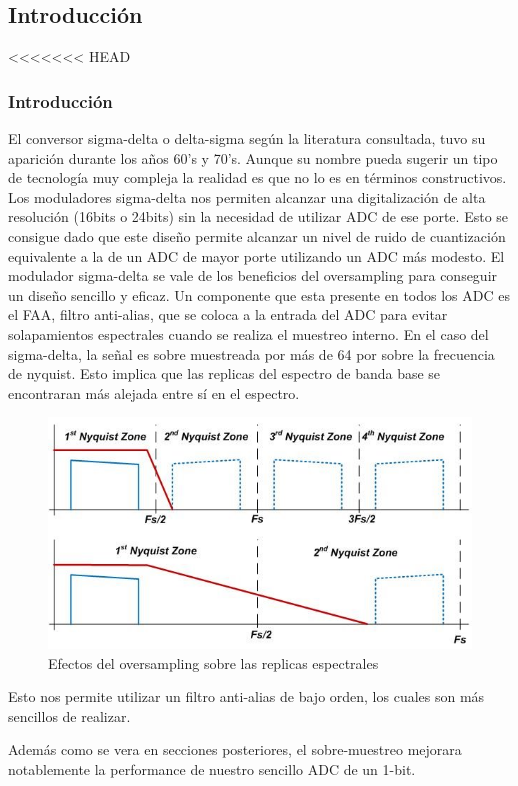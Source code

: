 
\subsection{Introducción}


<<<<<<< HEAD
\subsubsection{Introducción}
El conversor sigma-delta o delta-sigma según la literatura consultada, tuvo su aparición durante los años 60's y 70's. Aunque su nombre pueda sugerir un tipo de tecnología muy compleja la realidad es que no lo es en términos constructivos. Los moduladores sigma-delta nos permiten alcanzar una digitalización de alta resolución (16bits o 24bits) sin la necesidad de utilizar ADC de ese porte. Esto se consigue dado que este diseño permite alcanzar un nivel de ruido de cuantización equivalente a la de un ADC de mayor porte utilizando un ADC más modesto.
El modulador sigma-delta se vale de los beneficios del oversampling para conseguir un diseño sencillo y eficaz.
Un componente que esta presente en todos los ADC es el FAA, filtro anti-alias, que se coloca a la entrada del ADC para evitar solapamientos espectrales cuando se realiza el muestreo interno. En el caso del sigma-delta,  la señal es sobre muestreada por más de 64 por sobre la frecuencia de nyquist. Esto implica que las replicas del espectro de banda base se encontraran más alejada entre sí en el espectro.
\begin{figure}[H]
	\centering
	\includegraphics[width=0.7\linewidth]{ImagenesEjercicio2/Oversampling}
	\caption{Efectos del oversampling sobre las replicas espectrales}
	\label{fig:oversampling}
\end{figure}
Esto nos permite utilizar un filtro anti-alias de bajo orden, los cuales son más sencillos de realizar.


Además como se vera en secciones posteriores, el sobre-muestreo mejorara notablemente la performance de nuestro sencillo ADC de un 1-bit.

